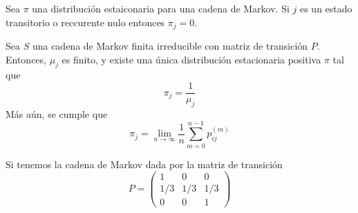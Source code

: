 \documentclass[PREyA.tex]{subfiles}
\begin{document}
\begin{prop}
Sea $\pi$ una distribución estaiconaria para una cadena de Markov. Si $j$ es un estado transitorio o reccurente nulo entonces $\pi_j=0$.
\end{prop}
\begin{theorem}
Sea $S$ una cadena de Markov finita irreducible con matriz de transición $P$. Entonces, $\mu_j$ es finito, y existe una única distribución estacionaria positiva $\pi$ tal que
$$
\pi_j = \frac{1}{\mu_j}
$$
Más aún, se cumple que
$$
\pi_j = \lim_{n\to \infty} \frac{1}{n}\sum_{m=0}^{n-1}p_{ij}^{(m)}
$$
\end{theorem}
\begin{example}
Si tenemos la cadena de Markov dada por la matriz de transición
$$
P = 
\begin{pmatrix}
1 & 0 & 0 \\
1/3 & 1/3 & 1/3\\
0 & 0 & 1
\end{pmatrix}
$$
\end{example}
\end{document}
